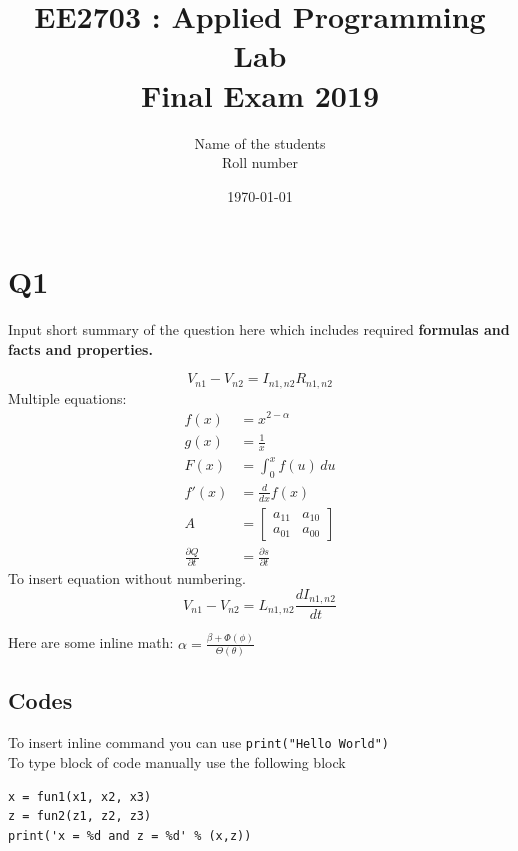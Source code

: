 \documentclass[12pt, a4paper]{report}
\title{\textbf{EE2703 : Applied Programming Lab \\ Final Exam 2019}} %
\author{Name of the students \\ Roll number} %
\date{\today} %
\begin{document}
		
		
\maketitle %
\section*{Q1}
 Input short summary of the question here which includes required  \textbf{formulas and facts and properties.} 
 
 \begin{equation}\label{eq:1}
 V_{n1}-V_{n2}=I_{n1,n2} R_{n1,n2}
 \end{equation}
 Multiple equations:
 \begin{align}
    f(x) &= x^{2-\alpha}\\
    g(x) &= \frac{1}{x}\\
    F(x) &= \int_{0}^{x} f(u)\,du\\
    f'(x) &= \frac{d}{dx}f(x)\\
    A    &= \begin{bmatrix}
            a_{1 1} & a_{1 0} \\
            a_{0 1} & a_{0 0}
           \end{bmatrix}\\
    \frac{\partial Q}{\partial t} &= \frac{\partial s}{\partial t}
 \end{align}
 To insert equation without numbering.
 \begin{equation*}
 V_{n1}-V_{n2}=L_{n1,n2} \frac{dI_{n1,n2}}{dt}
 \end{equation*}
 
 Here are some inline math: $ \alpha = \frac{\beta + \Phi (\phi) }{\Theta ( \theta )} $
 
 
 
 
 
 
\subsection*{Codes}
 To insert inline command you can use \texttt{print("Hello World")} \\
To type block of code manually use the following block
\begin{verbatim}	
x = fun1(x1, x2, x3)
z = fun2(z1, z2, z3)
print('x = %d and z = %d' % (x,z))
\end{verbatim}
\end{document}
